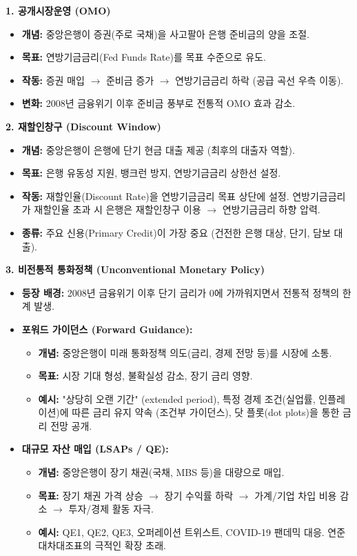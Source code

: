 \documentclass[11pt,a4paper]{article}
\begin{document}
\begin{tcolorbox}[summarybox, title=\textbf{중앙은행 통화정책 도구 요약}]
  \textbf{1. 공개시장운영 (OMO)}
  \begin{itemize}
    \item \textbf{개념:} 중앙은행이 증권(주로 국채)을 사고팔아 은행 준비금의 양을 조절.
    \item \textbf{목표:} 연방기금금리(Fed Funds Rate)를 목표 수준으로 유도.
    \item \textbf{작동:} 증권 매입 $\rightarrow$ 준비금 증가 $\rightarrow$ 연방기금금리 하락 (공급 곡선 우측 이동).
    \item \textbf{변화:} 2008년 금융위기 이후 준비금 풍부로 전통적 OMO 효과 감소.
  \end{itemize}

  \textbf{2. 재할인창구 (Discount Window)}
  \begin{itemize}
    \item \textbf{개념:} 중앙은행이 은행에 단기 현금 대출 제공 (최후의 대출자 역할).
    \item \textbf{목표:} 은행 유동성 지원, 뱅크런 방지, 연방기금금리 상한선 설정.
    \item \textbf{작동:} 재할인율(Discount Rate)을 연방기금금리 목표 상단에 설정. 연방기금금리가 재할인율 초과 시 은행은 재할인창구 이용 $\rightarrow$ 연방기금금리 하향 압력.
    \item \textbf{종류:} 주요 신용(Primary Credit)이 가장 중요 (건전한 은행 대상, 단기, 담보 대출).
  \end{itemize}

  \textbf{3. 비전통적 통화정책 (Unconventional Monetary Policy)}
  \begin{itemize}
    \item \textbf{등장 배경:} 2008년 금융위기 이후 단기 금리가 0에 가까워지면서 전통적 정책의 한계 발생.
    \item \textbf{포워드 가이던스 (Forward Guidance):}
      \begin{itemize}
        \item \textbf{개념:} 중앙은행이 미래 통화정책 의도(금리, 경제 전망 등)를 시장에 소통.
        \item \textbf{목표:} 시장 기대 형성, 불확실성 감소, 장기 금리 영향.
        \item \textbf{예시:} "상당히 오랜 기간" (extended period), 특정 경제 조건(실업률, 인플레이션)에 따른 금리 유지 약속 (조건부 가이던스), 닷 플롯(dot plots)을 통한 금리 전망 공개.
      \end{itemize}
    \item \textbf{대규모 자산 매입 (LSAPs / QE):}
      \begin{itemize}
        \item \textbf{개념:} 중앙은행이 장기 채권(국채, MBS 등)을 대량으로 매입.
        \item \textbf{목표:} 장기 채권 가격 상승 $\rightarrow$ 장기 수익률 하락 $\rightarrow$ 가계/기업 차입 비용 감소 $\rightarrow$ 투자/경제 활동 자극.
        \item \textbf{예시:} QE1, QE2, QE3, 오퍼레이션 트위스트, COVID-19 팬데믹 대응. 연준 대차대조표의 극적인 확장 초래.
      \end{itemize}
  \end{itemize}


\end{tcolorbox}
\end{document}
